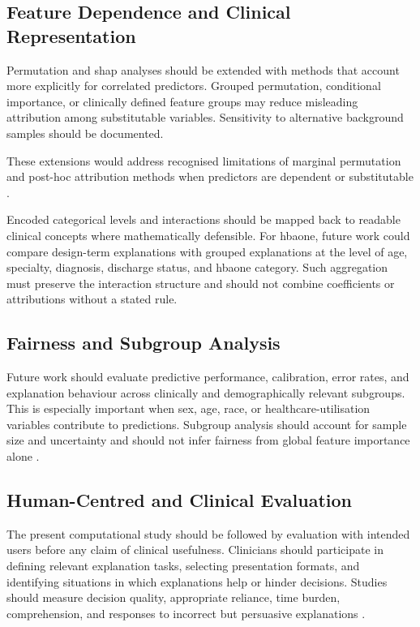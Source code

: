 \subsection{Feature Dependence and Clinical Representation}

Permutation and \gls{shap} analyses should be extended with methods that account more explicitly for correlated predictors. Grouped permutation, conditional importance, or clinically defined feature groups may reduce misleading attribution among substitutable variables. Sensitivity to alternative background samples should be documented.

These extensions would address recognised limitations of marginal permutation and post-hoc attribution methods when predictors are dependent or substitutable \citep{fisher_models_2019, strobl_conditional_2008, vilone_classification_2021}.

Encoded categorical levels and interactions should be mapped back to readable clinical concepts where mathematically defensible. For \gls{hbaone}, future work could compare design-term explanations with grouped explanations at the level of age, specialty, diagnosis, discharge status, and \gls{hbaone} category. Such aggregation must preserve the interaction structure and should not combine coefficients or attributions without a stated rule.

\subsection{Fairness and Subgroup Analysis}

Future work should evaluate predictive performance, calibration, error rates, and explanation behaviour across clinically and demographically relevant subgroups. This is especially important when sex, age, race, or healthcare-utilisation variables contribute to predictions. Subgroup analysis should account for sample size and uncertainty and should not infer fairness from global feature importance alone \citep{allgaier_how_2023, moons_probastai_2025}.

\subsection{Human-Centred and Clinical Evaluation}

The present computational study should be followed by evaluation with intended users before any claim of clinical usefulness. Clinicians should participate in defining relevant explanation tasks, selecting presentation formats, and identifying situations in which explanations help or hinder decisions. Studies should measure decision quality, appropriate reliance, time burden, comprehension, and responses to incorrect but persuasive explanations \citep{panigutti_co-design_2023, vasconcelos_explanations_2023,
lee_understanding_2023, vasey_decideai_2022}.

